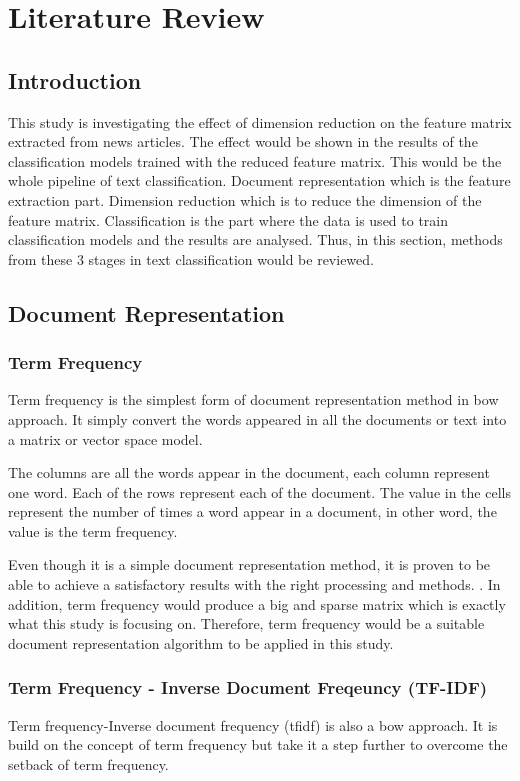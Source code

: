 \chapter{Literature Review}
\section{Introduction}
This study is investigating the effect of dimension reduction on the feature matrix extracted from news articles. The effect would be shown in the results of the classification models trained with the reduced feature matrix. This would be the whole pipeline of text classification. Document representation which is the feature extraction part. Dimension reduction which is to reduce the dimension of the feature matrix. Classification is the part where the data is used to train classification models and the results are analysed. Thus, in this section, methods from these 3 stages in text classification would be reviewed.\\

\section{Document Representation}
\subsection{Term Frequency}
Term frequency is the simplest form of document representation method in \ac{bow} approach. It simply convert the words appeared in all the documents or text into a matrix or vector space model.

The columns are all the words appear in the document, each column represent one word. Each of the rows represent each of the document. The value in the cells represent the number of times a word appear in a document, in other word, the value is the term frequency.

Even though it is a simple document representation method, it is proven to be able to achieve a satisfactory results with the right processing and methods. \cite{knnVectorSpaceReduction}. In addition, term frequency would produce a big and sparse matrix which is exactly what this study is focusing on. Therefore, term frequency would be a suitable document representation algorithm to be applied in this study.

\subsection{Term Frequency - Inverse Document Freqeuncy (TF-IDF)}
Term frequency-Inverse document frequency (\ac{tfidf}) is also a \ac{bow} approach. It is build on the concept of term frequency but take it a step further to overcome the setback of term frequency. 

